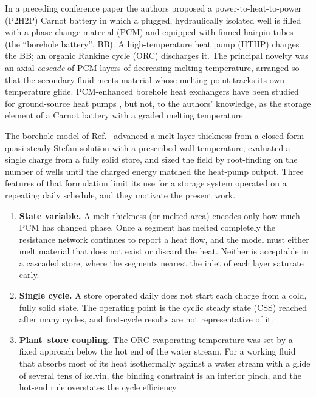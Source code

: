 In a preceding conference paper \cite{KoIHTC2026} the authors proposed a
power-to-heat-to-power (P2H2P) Carnot battery in which a plugged,
hydraulically isolated well is filled with a phase-change material (PCM) and
equipped with finned hairpin tubes (the ``borehole battery'', BB). A
high-temperature heat pump (HTHP) charges the BB; an organic Rankine cycle
(ORC) discharges it. The principal novelty was an axial \emph{cascade} of PCM
layers of decreasing melting temperature, arranged so that the secondary
fluid meets material whose melting point tracks its own temperature glide.
PCM-enhanced borehole heat exchangers have been studied for ground-source heat
pumps \cite{Qi2016,Zhou2025}, but not, to the authors' knowledge, as the
storage element of a Carnot battery with a graded melting temperature.

The borehole model of Ref.~\cite{KoIHTC2026} advanced a melt-layer thickness
from a closed-form quasi-steady Stefan solution with a prescribed wall
temperature, evaluated a single charge from a fully solid store, and sized the
field by root-finding on the number of wells until the charged energy matched
the heat-pump output. Three features of that formulation limit its use for a
storage system operated on a repeating daily schedule, and they motivate the
present work.

\begin{enumerate}[leftmargin=1.8em,itemsep=2pt]
\item \textbf{State variable.} A melt thickness (or melted area) encodes only
  how much PCM has changed phase. Once a segment has melted completely the
  resistance network continues to report a heat flow, and the model must
  either melt material that does not exist or discard the heat. Neither is
  acceptable in a cascaded store, where the segments nearest the inlet of each
  layer saturate early.
\item \textbf{Single cycle.} A store operated daily does not start each
  charge from a cold, fully solid state. The operating point is the cyclic
  steady state (CSS) reached after many cycles, and first-cycle results are
  not representative of it.
\item \textbf{Plant--store coupling.} The ORC evaporating temperature was
  set by a fixed approach below the hot end of the water stream. For a
  working fluid that absorbs most of its heat isothermally against a water
  stream with a glide of several tens of kelvin, the binding constraint is an
  interior pinch, and the hot-end rule overstates the cycle efficiency.
\end{enumerate}

